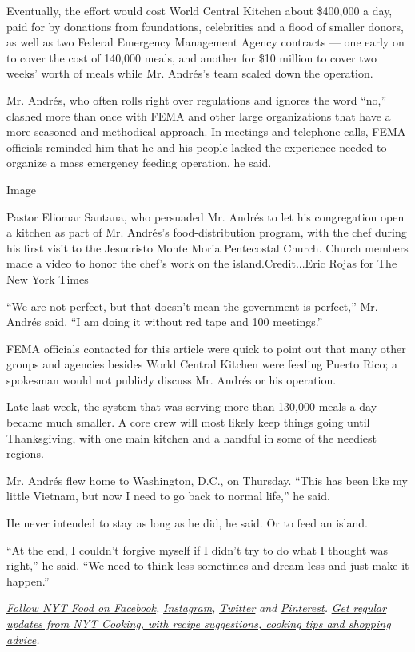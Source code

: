 Eventually, the effort would cost World Central Kitchen about \$400,000
a day, paid for by donations from foundations, celebrities and a flood
of smaller donors, as well as two Federal Emergency Management Agency
contracts --- one early on to cover the cost of 140,000 meals, and
another for \$10 million to cover two weeks' worth of meals while Mr.
Andrés's team scaled down the operation.

Mr. Andrés, who often rolls right over regulations and ignores the word
``no,'' clashed more than once with FEMA and other large organizations
that have a more-seasoned and methodical approach. In meetings and
telephone calls, FEMA officials reminded him that he and his people
lacked the experience needed to organize a mass emergency feeding
operation, he said.

Image

Pastor Eliomar Santana, who persuaded Mr. Andrés to let his congregation
open a kitchen as part of Mr. Andrés's food-distribution program, with
the chef during his first visit to the Jesucristo Monte Moria
Pentecostal Church. Church members made a video to honor the chef's work
on the island.Credit...Eric Rojas for The New York Times

``We are not perfect, but that doesn't mean the government is perfect,''
Mr. Andrés said. ``I am doing it without red tape and 100 meetings.''

FEMA officials contacted for this article were quick to point out that
many other groups and agencies besides World Central Kitchen were
feeding Puerto Rico; a spokesman would not publicly discuss Mr. Andrés
or his operation.

Late last week, the system that was serving more than 130,000 meals a
day became much smaller. A core crew will most likely keep things going
until Thanksgiving, with one main kitchen and a handful in some of the
neediest regions.

Mr. Andrés flew home to Washington, D.C., on Thursday. ``This has been
like my little Vietnam, but now I need to go back to normal life,'' he
said.

He never intended to stay as long as he did, he said. Or to feed an
island.

``At the end, I couldn't forgive myself if I didn't try to do what I
thought was right,'' he said. ``We need to think less sometimes and
dream less and just make it happen.''

\href{https://www.facebookcorewwwi.onion/nytfood/}{\emph{Follow NYT Food
on Facebook}}\emph{,}
\href{https://instagram.com/nytfood}{\emph{Instagram}}\emph{,}
\href{https://twitter.com/nytfood}{\emph{Twitter}} \emph{and}
\href{https://www.pinterest.com/nytfood/}{\emph{Pinterest}}\emph{.}
\href{https://www.nytimes3xbfgragh.onion/newsletters/cooking}{\emph{Get
regular updates from NYT Cooking, with recipe suggestions, cooking tips
and shopping advice}}\emph{.}

